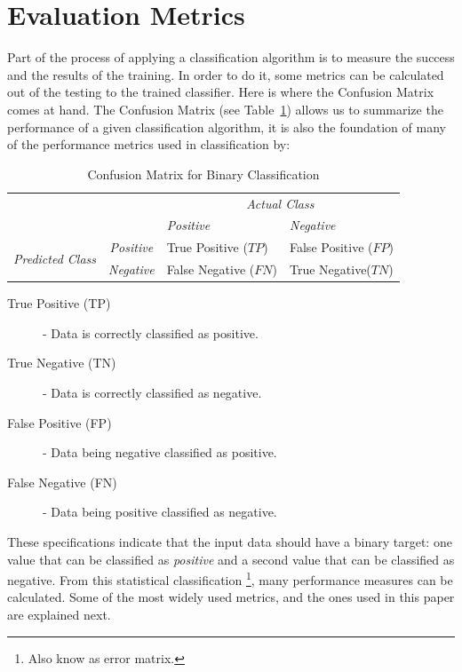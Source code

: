 \section{Evaluation Metrics}\label{sec:ev-metrics}

Part of the process of applying a classification algorithm is to measure the 
success and the results of the training. In order to do it, some metrics can be 
calculated out of the testing to the trained classifier. Here is where the
Confusion Matrix comes at hand. The Confusion Matrix (see 
Table~\ref{tab:conf-matrix}) allows us to summarize the performance of a given 
classification algorithm, it is also the foundation of many of the performance 
metrics used in classification by:

\begin{table}[h!]
\centering
\footnotesize
\caption{Confusion Matrix for Binary Classification}
\label{tab:conf-matrix}
\begin{tabular}{c c | p{2.5cm} | p{2.5cm} }
  & & \multicolumn{2}{c}{\emph{Actual Class}}\\
  & &    \emph{Positive} & \emph{Negative} \\
  \hline
  \multirow{4}{*}{\emph{Predicted Class}}
  &\emph{Positive} & True Positive \newline ($TP$) & False Positive \newline ($FP$)\\
  \cline{2-4}
  &\emph{Negative} & False Negative \newline ($FN$) & True Negative\newline ($TN$)\\
\end{tabular}
\end{table}

\begin{description}
 \item [True Positive (TP)] - Data is correctly classified as positive.
 \item [True Negative (TN)] - Data is correctly classified as negative.
 \item [False Positive (FP)] - Data being negative classified as positive.
 \item [False Negative (FN)] - Data being positive classified as negative. 
\end{description} 

These specifications indicate that the input data should have a binary target: 
one value that can be classified as \textit{positive} and a second value that 
can be classified as negative. From this statistical classification
\footnote{Also know as error matrix.}, many performance measures can be 
calculated. Some of the most widely used metrics, and the ones used in this 
paper are explained next.

